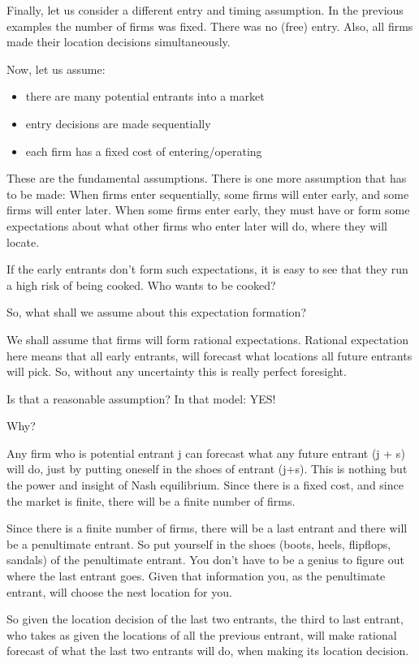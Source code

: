 \documentclass[
]{book}
\providecommand{\tightlist}{%
  \setlength{\itemsep}{0pt}\setlength{\parskip}{0pt}}
\begin{document}
Finally, let us consider a different entry and timing assumption. In the previous examples the number of firms was fixed. There was no (free) entry. Also, all firms made their location decisions simultaneously.

Now, let us assume:

\begin{itemize}
\tightlist
\item
  there are many potential entrants into a market
\item
  entry decisions are made sequentially
\item
  each firm has a fixed cost of entering/operating
\end{itemize}

These are the fundamental assumptions. There is one more assumption that has to be made: When firms enter sequentially, some firms will enter early, and some firms will enter later. When some firms enter early, they must have or form some expectations about what other firms who enter later will do, where they will locate.

If the early entrants don't form such expectations, it is easy to see that they run a high risk of being cooked. Who wants to be cooked?

So, what shall we assume about this expectation formation?

We shall assume that firms will form rational expectations. Rational expectation here means that all early entrants, will forecast what locations all future entrants will pick. So, without any uncertainty this is really perfect foresight.

Is that a reasonable assumption? In that model: YES!

Why?

Any firm who is potential entrant j can forecast what any future entrant (j + s) will do, just by putting oneself in the shoes of entrant (j+s). This is nothing but the power and insight of Nash equilibrium. Since there is a fixed cost, and since the market is finite, there will be a finite number of firms.

Since there is a finite number of firms, there will be a last entrant and there will be a penultimate entrant. So put yourself in the shoes (boots, heels, flipflops, sandals) of the penultimate entrant. You don't have to be a genius to figure out where the last entrant goes. Given that information you, as the penultimate entrant, will choose the nest location for you.

So given the location decision of the last two entrants, the third to last entrant, who takes as given the locations of all the previous entrant, will make rational forecast of what the last two entrants will do, when making its location decision.
\end{document}
